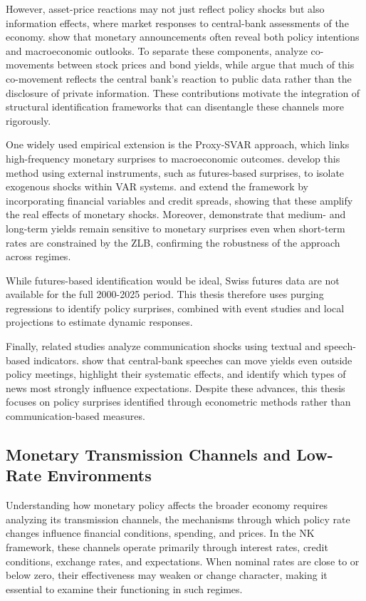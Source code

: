 \documentclass[12pt,a4paper]{article}
\begin{document}
However, asset-price reactions may not just reflect policy shocks but also information effects, where market responses to central-bank assessments of the economy.
\citet{cieslak2019} show that monetary announcements often reveal both policy intentions and macroeconomic outlooks.
To separate these components, \citet{jarocinski2020} analyze co-movements between stock prices and bond yields, while \citet{bauer2023} argue that much of this co-movement reflects the central bank’s reaction to public data rather than the disclosure of private information.
These contributions motivate the integration of structural identification frameworks that can disentangle these channels more rigorously.

One widely used empirical extension is the Proxy-SVAR approach, which links high-frequency monetary surprises to macroeconomic outcomes.
\citet{miranda2019} develop this method using external instruments, such as futures-based surprises, to isolate exogenous shocks within VAR systems.
\citet{gertler2015} and \citet{caldara2019} extend the framework by incorporating financial variables and credit spreads, showing that these amplify the real effects of monetary shocks.
Moreover, \citet{swanson2012} demonstrate that medium- and long-term yields remain sensitive to monetary surprises even when short-term rates are constrained by the ZLB, confirming the robustness of the approach across regimes.

While futures-based identification would be ideal, Swiss futures data are not available for the full 2000-2025 period. This thesis therefore uses purging regressions to identify policy surprises, combined with event studies and local projections to estimate dynamic responses.

Finally, related studies analyze communication shocks using textual and speech-based indicators.
\citet{jayawickrema2023} show that central-bank speeches can move yields even outside policy meetings, \citet{swanson2023} highlight their systematic effects, and \citet{kerssenfischer2024} identify which types of news most strongly influence expectations.
Despite these advances, this thesis focuses on policy surprises identified through econometric methods rather than communication-based measures.

\subsection{Monetary Transmission Channels and Low-Rate Environments}
Understanding how monetary policy affects the broader economy requires analyzing its transmission channels, the mechanisms through which policy rate changes influence financial conditions, spending, and prices. In the NK framework, these channels operate primarily through interest rates, credit conditions, exchange rates, and expectations. When nominal rates are close to or below zero, their effectiveness may weaken or change character, making it essential to examine their functioning in such regimes.
\end{document}
